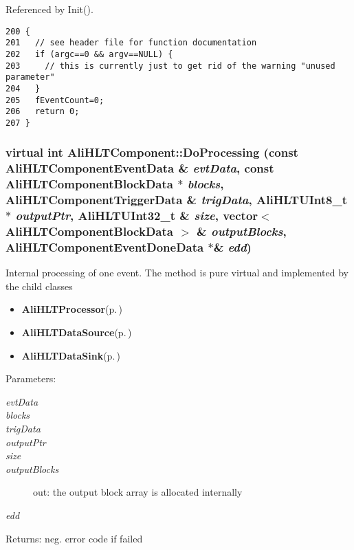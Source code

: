 Referenced by Init().

\footnotesize\begin{verbatim}200 {
201   // see header file for function documentation
202   if (argc==0 && argv==NULL) {
203     // this is currently just to get rid of the warning "unused parameter"
204   }
205   fEventCount=0;
206   return 0;
207 }
\end{verbatim}\normalsize 


\subsubsection{\setlength{\rightskip}{0pt plus 5cm}virtual int Ali\-HLTComponent::Do\-Processing (const {\bf Ali\-HLTComponent\-Event\-Data} \& {\em evt\-Data}, const {\bf Ali\-HLTComponent\-Block\-Data} $\ast$ {\em blocks}, {\bf Ali\-HLTComponent\-Trigger\-Data} \& {\em trig\-Data}, {\bf Ali\-HLTUInt8\_\-t} $\ast$ {\em output\-Ptr}, {\bf Ali\-HLTUInt32\_\-t} \& {\em size}, vector$<$ {\bf Ali\-HLTComponent\-Block\-Data} $>$ \& {\em output\-Blocks}, {\bf Ali\-HLTComponent\-Event\-Done\-Data} $\ast$\& {\em edd})\hspace{0.3cm}{\tt  [pure virtual]}}\label{classAliHLTComponent_a7}


Internal processing of one event. The method is pure virtual and implemented by the child classes\begin{itemize}
\item {\bf Ali\-HLTProcessor}{\rm (p.\,\pageref{classAliHLTProcessor})}\item {\bf Ali\-HLTData\-Source}{\rm (p.\,\pageref{classAliHLTDataSource})}\item {\bf Ali\-HLTData\-Sink}{\rm (p.\,\pageref{classAliHLTDataSink})}\end{itemize}


\begin{Desc}
\item[Parameters:]
\begin{description}
\item[{\em evt\-Data}]\item[{\em blocks}]\item[{\em trig\-Data}]\item[{\em output\-Ptr}]\item[{\em size}]\item[{\em output\-Blocks}]out: the output block array is allocated internally \item[{\em edd}]\end{description}
\end{Desc}
\begin{Desc}
\item[Returns:]neg. error code if failed \end{Desc}



